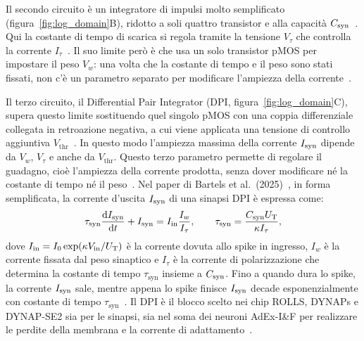 Il secondo circuito è un integratore di impulsi molto semplificato (figura~\ref{fig:log_domain}B), ridotto a soli quattro transistor e alla capacità $C_{\mathrm{syn}}$~\cite{indiveri2011}. Qui la costante di tempo di scarica si regola tramite la tensione $V_\tau$ che controlla la corrente $I_\tau$~\cite{indiveri2011}. Il suo limite però è che usa un solo transistor pMOS per impostare il peso $V_w$: una volta che la costante di tempo e il peso sono stati fissati, non c'è un parametro separato per modificare l'ampiezza della corrente~\cite{indiveri2011}.

Il terzo circuito, il Differential Pair Integrator (DPI, figura~\ref{fig:log_domain}C), supera questo limite sostituendo quel singolo pMOS con una coppia differenziale collegata in retroazione negativa, a cui viene applicata una tensione di controllo aggiuntiva $V_{\mathrm{thr}}$~\cite{indiveri2011}. In questo modo l'ampiezza massima della corrente $I_{\mathrm{syn}}$ dipende da $V_w$, $V_\tau$ e anche da $V_{\mathrm{thr}}$. Questo terzo parametro permette di regolare il guadagno, cioè l'ampiezza della corrente prodotta, senza dover modificare né la costante di tempo né il peso~\cite{indiveri2011, bartels2025}. Nel paper di Bartels et al.\ (2025)~\cite{bartels2025}, in forma semplificata, la corrente d'uscita $I_{\mathrm{syn}}$ di una sinapsi DPI è espressa come:
\begin{equation}
  \tau_{\mathrm{syn}} \frac{\mathrm{d}I_{\mathrm{syn}}}{\mathrm{d}t} + I_{\mathrm{syn}} = I_{\mathrm{in}} \frac{I_w}{I_\tau},
  \qquad
  \tau_{\mathrm{syn}} = \frac{C_{\mathrm{syn}} U_{\mathrm{T}}}{\kappa I_\tau},
  \label{eq:dpi_syn}
\end{equation}
dove $I_{\mathrm{in}} = I_0 \exp(\kappa V_{\mathrm{in}}/U_{\mathrm{T}})$ è la corrente dovuta allo spike in ingresso, $I_w$ è la corrente fissata dal peso sinaptico e $I_\tau$ è la corrente di polarizzazione che determina la costante di tempo $\tau_{\mathrm{syn}}$ insieme a $C_{\mathrm{syn}}$. Fino a quando dura lo spike, la corrente $I_{\mathrm{syn}}$ sale, mentre appena lo spike finisce $I_{\mathrm{syn}}$ decade esponenzialmente con costante di tempo $\tau_{\mathrm{syn}}$~\cite{indiveri2011, bartels2025}. Il DPI è il blocco scelto nei chip ROLLS, DYNAPs e DYNAP-SE2 sia per le sinapsi, sia nel soma dei neuroni AdEx-I\&F per realizzare le perdite della membrana e la corrente di adattamento~\cite{indiveri2011, qiao2015, moradi2018, bartels2025}.

